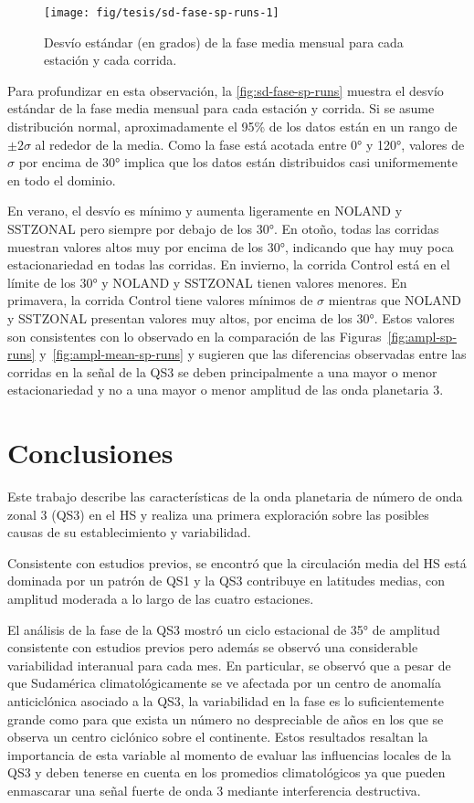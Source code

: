 \documentclass[spanish,a4paper,12pt,oneside]{book}
\begin{document}
\begin{figure}
\texttt{[image: fig/tesis/sd-fase-sp-runs-1]} \caption{Desvío estándar (en grados) de la fase media mensual para cada estación y cada corrida.}\label{fig:sd-fase-sp-runs}
\end{figure}

Para profundizar en esta observación, la \autoref{fig:sd-fase-sp-runs}
muestra el desvío estándar de la fase media mensual para cada estación y
corrida. Si se asume distribución normal, aproximadamente el 95\% de los
datos están en un rango de \(\pm 2\sigma\) al rededor de la media. Como
la fase está acotada entre 0° y 120°, valores de \(\sigma\) por encima
de 30° implica que los datos están distribuidos casi uniformemente en
todo el dominio.

En verano, el desvío es mínimo y aumenta ligeramente en NOLAND y
SSTZONAL pero siempre por debajo de los 30°. En otoño, todas las
corridas muestran valores altos muy por encima de los 30°, indicando que
hay muy poca estacionariedad en todas las corridas. En invierno, la
corrida Control está en el límite de los 30° y NOLAND y SSTZONAL tienen
valores menores. En primavera, la corrida Control tiene valores mínimos
de \(\sigma\) mientras que NOLAND y SSTZONAL presentan valores muy
altos, por encima de los 30°. Estos valores son consistentes con lo
observado en la comparación de las Figuras~\ref{fig:ampl-sp-runs}
y~\ref{fig:ampl-mean-sp-runs} y sugieren que las diferencias observadas
entre las corridas en la señal de la QS3 se deben principalmente a una
mayor o menor estacionariedad y no a una mayor o menor amplitud de las
onda planetaria 3.

\chapter{Conclusiones}\label{conclusiones}

Este trabajo describe las características de la onda planetaria de
número de onda zonal 3 (QS3) en el HS y realiza una primera exploración
sobre las posibles causas de su establecimiento y variabilidad.

Consistente con estudios previos, se encontró que la circulación media
del HS está dominada por un patrón de QS1 y la QS3 contribuye en
latitudes medias, con amplitud moderada a lo largo de las cuatro
estaciones.

El análisis de la fase de la QS3 mostró un ciclo estacional de 35° de
amplitud consistente con estudios previos pero además se observó una
considerable variabilidad interanual para cada mes. En particular, se
observó que a pesar de que Sudamérica climatológicamente se ve afectada
por un centro de anomalía anticiclónica asociado a la QS3, la
variabilidad en la fase es lo suficientemente grande como para que
exista un número no despreciable de años en los que se observa un centro
ciclónico sobre el continente. Estos resultados resaltan la importancia
de esta variable al momento de evaluar las influencias locales de la QS3
y deben tenerse en cuenta en los promedios climatológicos ya que pueden
enmascarar una señal fuerte de onda 3 mediante interferencia
destructiva.
\end{document}
